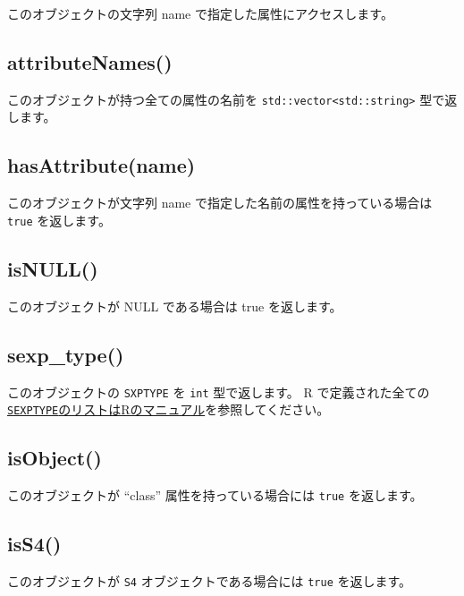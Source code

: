\documentclass[]{book}
\begin{document}
このオブジェクトの文字列 name で指定した属性にアクセスします。

\hypertarget{attributenames}{%
\subsection{attributeNames()}\label{attributenames}}

このオブジェクトが持つ全ての属性の名前を \texttt{std::vector\textless{}std::string\textgreater{}} 型で返します。

\hypertarget{hasattributename}{%
\subsection{hasAttribute(name)}\label{hasattributename}}

このオブジェクトが文字列 name で指定した名前の属性を持っている場合は \texttt{true} を返します。

\hypertarget{isnull}{%
\subsection{isNULL()}\label{isnull}}

このオブジェクトが NULL である場合は true を返します。

\hypertarget{sexp_type}{%
\subsection{sexp\_type()}\label{sexp_type}}

このオブジェクトの \texttt{SXPTYPE} を \texttt{int} 型で返します。 R で定義された全ての\href{https://cran.r-project.org/doc/manuals/r-release/R-ints.html\#SEXPTYPEs}{\texttt{SEXPTYPE}のリストはRのマニュアル}を参照してください。

\hypertarget{isobject}{%
\subsection{isObject()}\label{isobject}}

このオブジェクトが ``class'' 属性を持っている場合には \texttt{true} を返します。

\hypertarget{iss4}{%
\subsection{isS4()}\label{iss4}}

このオブジェクトが \texttt{S4} オブジェクトである場合には \texttt{true} を返します。
\end{document}
